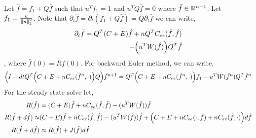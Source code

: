 \documentclass{article}[draft]
\begin{document}
Let $\hat{f} = f_1 + Q\bar{f}$ such that $u^T f_1 = 1$ and $u^T Q\bar{f}=0$ where $\bar{f}\in \mathbb{R}^{n-1}$.  Let $f_1= \frac{u}{\left\lVert u\right\rVert_2^2}$. Note that $\partial_t \hat{f} = \partial_t (f_1 + Q\bar{f} ) = Q\partial_t \bar{f}$ we can write, 
\begin{align*}
	\partial_t \bar{f} = Q^T(C+E)\hat{f} + n Q^T C_{ee}(\hat{f}, \hat{f}) \\
	- \of{u^T W(\hat{f})} Q^T\hat{f}
\end{align*}, where $\bar{f}(0) = Rf(0)$. 
For backward Euler method, we can write, 
\begin{align*}
	\of{I - dtQ^T \of{C+ E + n C_{ee}(\hat{f}^{n},\cdot)} Q} \bar{f}^{n+1} = Q^T\of{C+E + n C_{ee}(\hat{f}^{n},\cdot)}f_1 -u^T W(\hat{f}^{n}) Q^T \hat{f}^{n}
 \end{align*}
For the steady state solve let, 
\begin{align*}
R(\hat{f}) &= (C+E)\hat{f} + nC_{ee}(\hat{f},\hat{f}) -(u^TW(\hat{f})) \hat{f}\\
R(\hat{f} + d\hat{f}) \approx &(C+E)\hat{f} + nC_{ee}(\hat{f}, \hat{f}) -(u^TW(\hat{f}))\hat{f} 
						+ \of{C+ E + nC_{ee}(\cdot, \hat{f}) + nC_{ee}(\hat{f},\cdot)} d\hat{f} \\
R(\hat{f} + d\hat{f}) &\approx R(\hat{f}) + J(\hat{f}) d\hat{f}
\end{align*}
%
\end{document}
